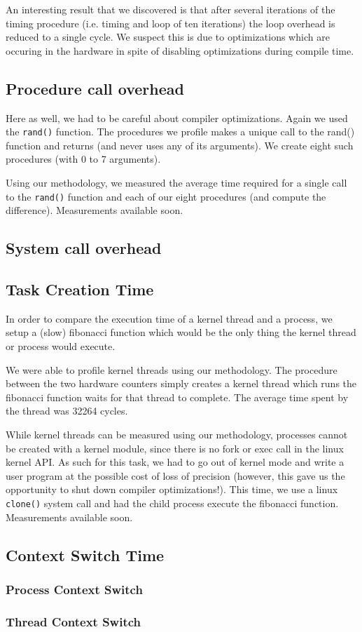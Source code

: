 An interesting result that we discovered is that after several iterations of the
timing procedure (i.e. timing and loop of ten iterations) the loop overhead is
reduced to a single cycle. We suspect this is due to optimizations which are
occuring in the hardware in spite of disabling optimizations during compile
time.

\subsection{Procedure call overhead}

Here as well, we had to be careful about compiler optimizations. Again we used
the \texttt{rand()} function. The procedures we profile makes a unique call to
the rand() function and returns (and never uses any of its arguments). We create
eight such procedures (with 0 to 7 arguments).

Using our methodology, we measured the average time required for a single call
to the \texttt{rand()} function and each of our eight procedures (and compute
the difference). Measurements available soon.

\subsection{System call overhead}

\subsection{Task Creation Time}

In order to compare the execution time of a kernel thread and a process, we
setup a (slow) fibonacci function which would be the only thing the kernel
thread or process would execute.

We were able to profile kernel threads using our methodology. The procedure
between the two hardware counters simply creates a kernel thread which runs the
fibonacci function waits for that thread to complete. The average time spent by
the thread was 32264 cycles.

While kernel threads can be measured using our methodology, processes cannot be
created with a kernel module, since there is no fork or exec call in the linux
kernel API. As such for this task, we had to go out of kernel mode and write a
user program at the possible cost of loss of precision (however, this gave us
the opportunity to shut down compiler optimizations!). This time, we use a linux
\texttt{clone()} system call and had the child process execute the fibonacci
function. Measurements available soon.

\subsection{Context Switch Time}
\subsubsection{Process Context Switch}
\subsubsection{Thread Context Switch}
